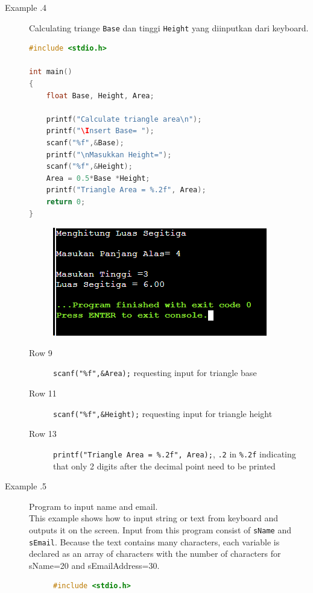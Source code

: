 \begin{description}
	\item  [Example \thesubsection.4] Calculating triange \verb*|Base|   dan tinggi \verb*|Height| yang diinputkan dari keyboard.
	      \begin{lstlisting}[language=c]
#include <stdio.h>

int main()
{
	float Base, Height, Area;
	
	printf("Calculate triangle area\n");
	printf("\Insert Base= ");
	scanf("%f",&Base);
	printf("\nMasukkan Height=");
	scanf("%f",&Height);
	Area = 0.5*Base *Height;
	printf("Triangle Area = %.2f", Area);
	return 0;
}
	\end{lstlisting}
	      \begin{figure}[H]
		      \centering
		      \includegraphics[width=0.5\linewidth]{P1/img/screenshot0005.png}
		      \caption{}
		      \label{fig:screenshot0005}
	      \end{figure}

	      \begin{description}
		      \item [Row 9]\verb|scanf("%f",&Area);| requesting input for triangle base
		      \item [Row 11]\verb|scanf("%f",&Height);| requesting input for triangle height
		      \item [Row 13]\verb|printf("Triangle Area = %.2f", Area);|,  \verb|.2| in \verb|%.2f| indicating that only 2 digits after the decimal point need to be printed
	      \end{description}

	\item[Example \thesubsection.5] Program to input name and email.\\
		This example shows how to input string or text from keyboard and outputs it on the screen. Input from this program consist of \verb|sName| and \verb|sEmail|. Because the text contains many characters, each variable is declared as an array of characters with the number of characters for sName=20 and sEmailAddress=30.
		\begin{figure}[H]
			\begin{lstlisting}[language=c]
		#include <stdio.h>
		

\end{lstlisting}
\end{figure}
\end{description}
